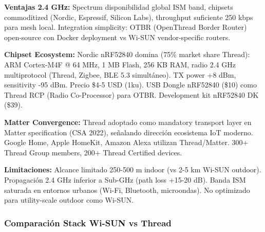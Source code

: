 \textbf{Ventajas 2.4 GHz:} Spectrum disponibilidad global ISM band, chipsets commoditized (Nordic, Espressif, Silicon Labs), throughput suficiente 250 kbps para mesh local. Integration simplicity: OTBR (OpenThread Border Router) open-source con Docker deployment vs Wi-SUN vendor-specific routers.

\textbf{Chipset Ecosystem:} Nordic nRF52840 domina (75\% market share Thread): ARM Cortex-M4F @ 64 MHz, 1 MB Flash, 256 KB RAM, radio 2.4 GHz multiprotocol (Thread, Zigbee, BLE 5.3 simultáneo). TX power +8 dBm, sensitivity -95 dBm. Precio \$4-5 USD (1ku). USB Dongle nRF52840 (\$10) como Thread RCP (Radio Co-Processor) para OTBR. Development kit nRF52840 DK (\$39).

\textbf{Matter Convergence:} Thread adoptado como mandatory transport layer en Matter specification (CSA 2022), señalando dirección ecosistema IoT moderno. Google Home, Apple HomeKit, Amazon Alexa utilizan Thread/Matter. 300+ Thread Group members, 200+ Thread Certified devices.

\textbf{Limitaciones:} Alcance limitado 250-500 m indoor (vs 2-5 km Wi-SUN outdoor). Propagación 2.4 GHz inferior a Sub-GHz (path loss +15-20 dB). Banda ISM saturada en entornos urbanos (Wi-Fi, Bluetooth, microondas). No optimizado para utility-scale outdoor como Wi-SUN.

\subsubsection{Comparación Stack Wi-SUN vs Thread}

